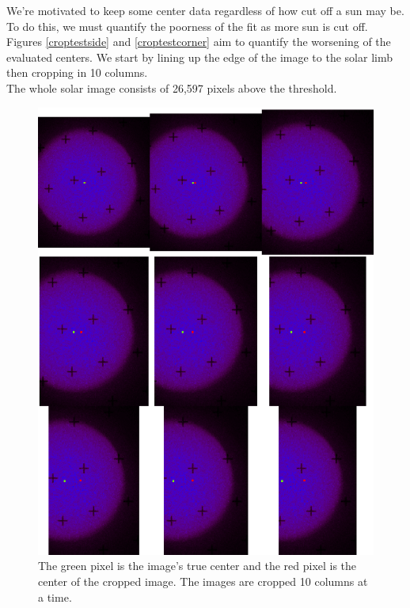 \documentclass[10pt]{scrartcl}
\begin{document}
We're motivated to keep some center data regardless of how cut off a sun may be. To do this, we must quantify the poorness of the fit as more sun is cut off. Figures \ref{croptestside} and \ref{croptestcorner} aim to quantify the worsening of the evaluated centers. We start by lining up the edge of the image to the solar limb then cropping in 10 columns. \\

The whole solar image consists of 26,597 pixels above the threshold.
\begin{figure}[!ht]
    \centering
    \includegraphics[width=.9\textwidth]{../plots_tables_images/cutofftestside.eps}    
    \caption{The green pixel is the image's true center and the red pixel is the center of the cropped image. The images are cropped 10 columns at a time.}
    \label{crop9side}
\end{figure}
\end{document}
